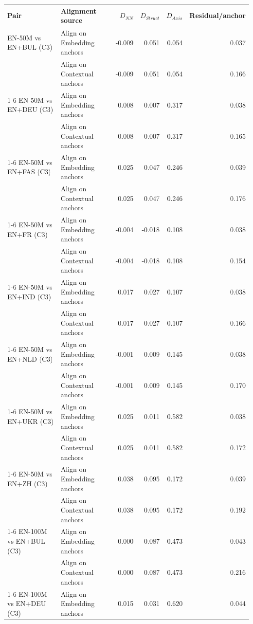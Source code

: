 \begin{tabular}{@{}llrrrr@{}}
\toprule
Pair & Alignment source & $D_{NN}$ & $D_{Struct}$ & $D_{Axis}$ & Residual/anchor \\
\midrule
EN-50M vs EN+BUL (C3) & Align on Embedding anchors & -0.009 & 0.051 & 0.054 & 0.037 \\
 & Align on Contextual anchors & -0.009 & 0.051 & 0.054 & 0.166 \\
\cmidrule(lr){1-6}
EN-50M vs EN+DEU (C3) & Align on Embedding anchors & 0.008 & 0.007 & 0.317 & 0.038 \\
 & Align on Contextual anchors & 0.008 & 0.007 & 0.317 & 0.165 \\
\cmidrule(lr){1-6}
EN-50M vs EN+FAS (C3) & Align on Embedding anchors & 0.025 & 0.047 & 0.246 & 0.039 \\
 & Align on Contextual anchors & 0.025 & 0.047 & 0.246 & 0.176 \\
\cmidrule(lr){1-6}
EN-50M vs EN+FR (C3) & Align on Embedding anchors & -0.004 & -0.018 & 0.108 & 0.038 \\
 & Align on Contextual anchors & -0.004 & -0.018 & 0.108 & 0.154 \\
\cmidrule(lr){1-6}
EN-50M vs EN+IND (C3) & Align on Embedding anchors & 0.017 & 0.027 & 0.107 & 0.038 \\
 & Align on Contextual anchors & 0.017 & 0.027 & 0.107 & 0.166 \\
\cmidrule(lr){1-6}
EN-50M vs EN+NLD (C3) & Align on Embedding anchors & -0.001 & 0.009 & 0.145 & 0.038 \\
 & Align on Contextual anchors & -0.001 & 0.009 & 0.145 & 0.170 \\
\cmidrule(lr){1-6}
EN-50M vs EN+UKR (C3) & Align on Embedding anchors & 0.025 & 0.011 & 0.582 & 0.038 \\
 & Align on Contextual anchors & 0.025 & 0.011 & 0.582 & 0.172 \\
\cmidrule(lr){1-6}
EN-50M vs EN+ZH (C3) & Align on Embedding anchors & 0.038 & 0.095 & 0.172 & 0.039 \\
 & Align on Contextual anchors & 0.038 & 0.095 & 0.172 & 0.192 \\
\cmidrule(lr){1-6}
EN-100M vs EN+BUL (C3) & Align on Embedding anchors & 0.000 & 0.087 & 0.473 & 0.043 \\
 & Align on Contextual anchors & 0.000 & 0.087 & 0.473 & 0.216 \\
\cmidrule(lr){1-6}
EN-100M vs EN+DEU (C3) & Align on Embedding anchors & 0.015 & 0.031 & 0.620 & 0.044 \\

\end{tabular}
